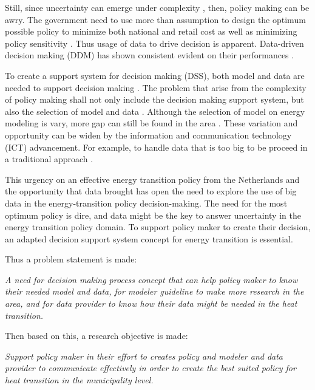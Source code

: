 Still, since uncertainty can emerge under complexity  \citep{Kauffman1993THEEvolution,Kauffman1995AtTrove}, then, policy making can be awry. The government need to use more than assumption to design the optimum possible policy to minimize both national and retail cost as well as minimizing policy sensitivity \citep{ExpertiseCentrumWarmte2019HandreikingAnalyse}. Thus usage of data to drive decision is apparent. Data-driven decision making (DDM) has shown consistent evident on their performances \citep{Brynjolfsson2016TheDecision-making}.

To create a support system for decision making (DSS), both model and data are needed to support decision making \citep{Sage1991DecisionEngineering, Sprague1980ASystems}. The problem that arise from the complexity of policy making shall not only include the decision making support system, but also the selection of model and data \citep{Sage1991DecisionEngineering, Sprague1979BitSystems}. Although the selection of model on energy modeling is vary, more gap can still be found in the area \citep{Hesselink2019AdoptionStudies, Friege2014ModellingReview}. These variation and opportunity can be widen by the information and communication technology (ICT) advancement. For example, to handle data that is too big to be proceed in a traditional approach \citep{Provost2013DataMaking}. 


\smallskip{}
This urgency on an effective energy transition policy from the Netherlands and the opportunity that data brought has open the need to explore the use of big data in the energy-transition policy decision-making. The need for the most optimum policy is dire, and data might be the key to answer uncertainty in the energy transition policy domain. To support policy maker to create their decision, an adapted decision support system concept for energy transition is essential. 

Thus a problem statement is made:

\textit{A need for decision making process concept that can help policy maker to know their needed model and data, for modeler guideline to make more research in the area, and for data provider to know how their data might be needed in the heat transition.}

Then based on this, a research objective is made:

\textit{Support policy maker in their effort to creates policy and modeler and data provider to communicate effectively in order to create the best suited policy for heat transition in the municipality level.}


